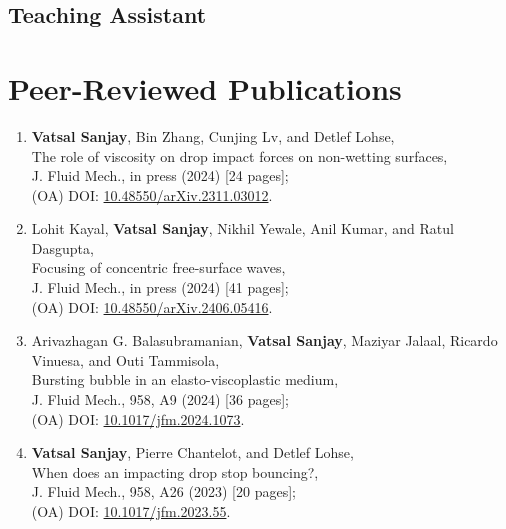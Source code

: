 \documentclass[11pt,a4paper,roman,english,colorlinks,linkcolor={red!50!black}]{moderncv}
\begin{document}
\subsection{Teaching Assistant}


\section{\textbf{Peer-Reviewed Publications}}

\begin{enumerate}[leftmargin=0.75cm]
	\item \textbf{Vatsal Sanjay}, Bin Zhang, Cunjing Lv, and Detlef Lohse,\\
	The role of viscosity on drop impact forces on non-wetting surfaces,\\
	J. Fluid Mech., in press (2024) [24 pages];\\
	(OA) DOI: \href{https://doi.org/10.48550/arXiv.2311.03012}{10.48550/arXiv.2311.03012}.

	\item Lohit Kayal, \textbf{Vatsal Sanjay}, Nikhil Yewale, Anil Kumar, and Ratul Dasgupta,\\
	Focusing of concentric free-surface waves,\\
	J. Fluid Mech., in press (2024) [41 pages];\\
	(OA) DOI: \href{https://doi.org/10.48550/arXiv.2406.05416}{10.48550/arXiv.2406.05416}.

	\item Arivazhagan G. Balasubramanian, \textbf{Vatsal Sanjay}, Maziyar Jalaal, Ricardo Vinuesa, and Outi Tammisola,\\
	Bursting bubble in an elasto-viscoplastic medium,\\
	J. Fluid Mech., 958, A9 (2024) [36 pages];\\
	(OA) DOI: \href{https://doi.org/10.1017/jfm.2024.1073}{10.1017/jfm.2024.1073}.

	\item \textbf{Vatsal Sanjay}, Pierre Chantelot, and Detlef Lohse,\\
	When does an impacting drop stop bouncing?,\\
	J. Fluid Mech., 958, A26 (2023) [20 pages];\\
	(OA) DOI: \href{https://doi.org/10.1017/jfm.2023.55}{10.1017/jfm.2023.55}.


\end{enumerate}
\end{document}
